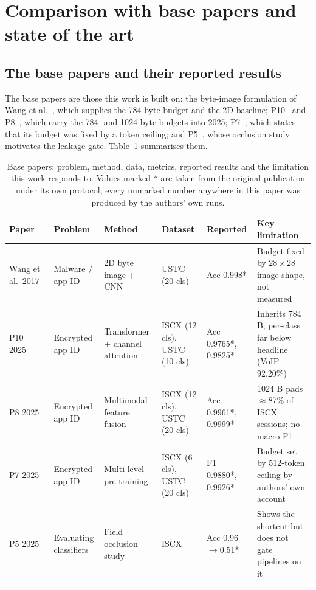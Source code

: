 \documentclass[pdflatex,sn-mathphys-num]{sn-jnl}
\theoremstyle{thmstyleone}%
\theoremstyle{thmstylethree}%
\begin{document}
\section{Comparison with base papers and state of the art}\label{sec:basepapers}

\subsection{The base papers and their reported results}

The base papers are those this work is built on: the byte-image formulation of
Wang et al.~\cite{ustc}, which supplies the 784-byte budget and the 2D
baseline; P10~\cite{p10} and P8~\cite{p8}, which carry the 784- and 1024-byte
budgets into 2025; P7~\cite{p7}, which states that its budget was fixed by a
token ceiling; and P5~\cite{p5}, whose occlusion study motivates the leakage
gate. Table~\ref{tab:basepapers} summarises them.

\begin{table}[tbp]
\caption{Base papers: problem, method, data, metrics, reported results and the
limitation this work responds to. Values marked $*$ are taken from the original
publication under its own protocol; every unmarked number anywhere in this
paper was produced by the authors' own runs.}\label{tab:basepapers}
\small
\begin{tabular}{@{}p{13mm}p{17mm}p{17mm}p{16mm}p{14mm}p{26mm}@{}}
\toprule
Paper & Problem & Method & Dataset & Reported & Key limitation \\
\midrule
Wang et al.\ 2017~\cite{ustc} &
Malware / app ID &
2D byte image + CNN &
USTC (20 cls) &
Acc 0.998* &
Budget fixed by $28\times28$ image shape, not measured \\
\addlinespace
P10 2025~\cite{p10} &
Encrypted app ID &
Transformer + channel attention &
ISCX (12 cls), USTC (10 cls) &
Acc 0.9765*, 0.9825* &
Inherits 784 B; per-class far below headline (VoIP 92.20\%) \\
\addlinespace
P8 2025~\cite{p8} &
Encrypted app ID &
Multimodal feature fusion &
ISCX (12 cls), USTC (20 cls) &
Acc 0.9961*, 0.9999* &
1024 B pads $\approx$87\% of ISCX sessions; no macro-F1 \\
\addlinespace
P7 2025~\cite{p7} &
Encrypted app ID &
Multi-level pre-training &
ISCX (6 cls), USTC (20 cls) &
F1 0.9880*, 0.9926* &
Budget set by 512-token ceiling by authors' own account \\
\addlinespace
P5 2025~\cite{p5} &
Evaluating classifiers &
Field occlusion study &
ISCX &
Acc 0.96$\to$0.51* &
Shows the shortcut but does not gate pipelines on it \\
\botrule
\end{tabular}
\end{table}
\end{document}
